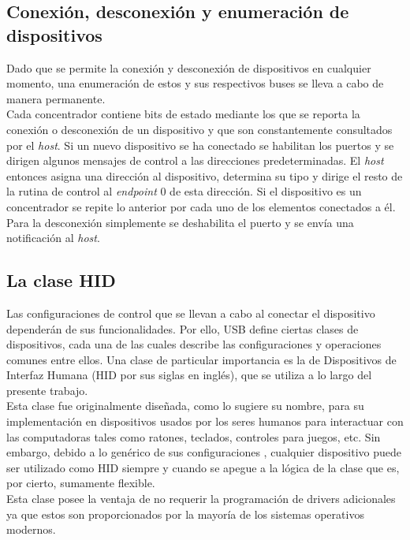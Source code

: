 \documentclass[letterpaper,openright,12pt]{book}
\begin{document}
\subsection{Conexión, desconexión y enumeración de dispositivos}
Dado que se permite la conexión y desconexión de dispositivos en cualquier momento, una enumeración de estos y sus respectivos buses se lleva a cabo de manera permanente.\\
Cada concentrador contiene bits de estado mediante los que se reporta la conexión o desconexión de un dispositivo y que son constantemente consultados por el \emph{host}. Si un nuevo dispositivo se ha conectado  se habilitan los puertos y se dirigen algunos mensajes de control a las direcciones predeterminadas. El \emph{host} entonces asigna una dirección al dispositivo, determina su tipo y dirige el resto de la rutina de control al \emph{endpoint} 0 de esta dirección. Si el dispositivo es un concentrador se repite lo anterior por cada uno de los elementos conectados a él. Para la desconexión simplemente se deshabilita el puerto y se envía una notificación al \emph{host}\cite{usbspec}.\\


\subsection{La clase HID}
Las configuraciones de control que se llevan a cabo al conectar el dispositivo dependerán de sus funcionalidades. Por ello, USB define ciertas clases de dispositivos, cada una de las cuales describe las configuraciones y operaciones comunes entre ellos. Una clase de particular importancia es la de Dispositivos de Interfaz Humana (HID por sus siglas en inglés), que se utiliza a lo largo del presente trabajo.\\
Esta clase fue originalmente diseñada, como lo sugiere su nombre, para su implementación en dispositivos usados por los seres humanos para interactuar con las computadoras tales como ratones, teclados, controles para juegos, etc. Sin embargo, debido a lo genérico de sus configuraciones , cualquier dispositivo puede ser utilizado como HID siempre y cuando se apegue a la lógica de la clase que es, por cierto, sumamente flexible.\\
Esta clase posee la ventaja de no requerir la programación de drivers adicionales ya que estos son proporcionados por la mayoría de los sistemas operativos modernos.\\ 

\end{document}
